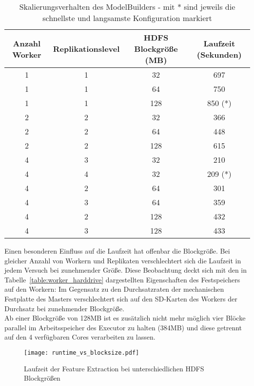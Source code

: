 \begin{table}[ht]
	\centering %
	\begin{tabular}{c c c c} %
	\hline\hline %
	Anzahl Worker & Replikationslevel & HDFS Blockgröße (MB) & Laufzeit (Sekunden) \\ [0.5ex] %
	\hline %
	1 & 1 & 32 & 697 \\ %
	1 & 1 & 64 & 750 \\
	1 & 1 & 128 & 850 (*)\\
	2 & 2 & 32 & 366 \\
	2 & 2 & 64 & 448 \\
	2 & 2 & 128 & 615 \\
	4 & 3 & 32 & 210 \\
	4 & 4 & 32 & 209 (*)\\
	4 & 2 & 64 & 301 \\
	4 & 3 & 64 & 359 \\
	4 & 2 & 128 & 432 \\
	4 & 3 & 128 & 433 \\ [1ex] 
	\hline %
	\end{tabular}
	\caption{Skalierungsverhalten des ModelBuilders - mit * sind jeweils die schnellste und langsamste Konfiguration markiert} %
	\label{table:scaling} %
\end{table}

Einen besonderen Einfluss auf die Laufzeit hat offenbar die Blockgröße. Bei gleicher Anzahl von Workern und Replikaten verschlechtert sich die Laufzeit in jedem Versuch bei zunehmender Größe. Diese Beobachtung deckt sich mit den in Tabelle~\ref{table:worker_harddrive} dargestellten Eigenschaften des Festspeichers auf den Workern: 
Im Gegensatz zu den Durchsatzraten der mechanischen Festplatte des Masters verschlechtert sich auf den SD-Karten des Workers der Durchsatz bei zunehmender Blockgröße.\\
Ab einer Blockgröße von 128MB ist es zusätzlich nicht mehr möglich vier Blöcke parallel im Arbeitsspeicher des Executor zu halten (384MB) und diese getrennt auf den 4 verfügbaren Cores verarbeiten zu lassen.

\begin{figure}[ht!]
	\centering
  \texttt{[image: runtime\_vs\_blocksize.pdf]}
	\caption{Laufzeit der Feature Extraction bei unterschiedlichen HDFS Blockgrößen}
	\label{figure:runtime_vs_blocksize}
\end{figure}

